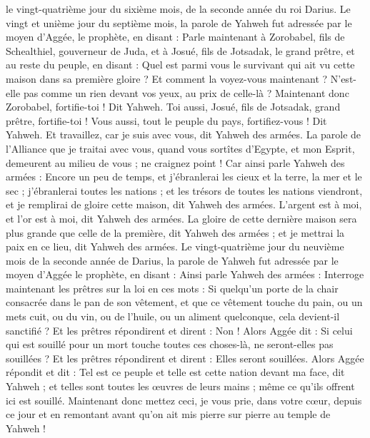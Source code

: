 \begin{multicols}{2}
le vingt-quatrième jour du sixième mois, de la seconde année du roi Darius.
\VerseOne{}Le vingt et unième jour du septième mois, la parole de Yahweh fut adressée par le moyen d'Aggée, le prophète, en disant :
Parle maintenant à Zorobabel, fils de Schealthiel, gouverneur de Juda, et à Josué, fils de Jotsadak, le grand prêtre, et au reste du peuple, en disant :
Quel est parmi vous le survivant qui ait vu cette maison dans sa première gloire ? Et comment la voyez-vous maintenant ? N'est-elle pas comme un rien devant vos yeux, au prix de celle-là ?
Maintenant donc Zorobabel, fortifie-toi ! Dit Yahweh. Toi aussi, Josué, fils de Jotsadak, grand prêtre, fortifie-toi ! Vous aussi, tout le peuple du pays, fortifiez-vous ! Dit Yahweh. Et travaillez, car je suis avec vous, dit Yahweh des armées.
La parole de l'Alliance que je traitai avec vous, quand vous sortîtes d'Egypte, et mon Esprit, demeurent au milieu de vous ; ne craignez point !
Car ainsi parle Yahweh des armées : Encore un peu de temps, et j'ébranlerai les cieux et la terre, la mer et le sec ;
j'ébranlerai toutes les nations ; et les trésors de toutes les nations viendront, et je remplirai de gloire cette maison, dit Yahweh des armées.
L'argent est à moi, et l'or est à moi, dit Yahweh des armées.
La gloire de cette dernière maison sera plus grande que celle de la première, dit Yahweh des armées ; et je mettrai la paix en ce lieu, dit Yahweh des armées.
Le vingt-quatrième jour du neuvième mois de la seconde année de Darius, la parole de Yahweh fut adressée par le moyen d'Aggée le prophète, en disant :
Ainsi parle Yahweh des armées : Interroge maintenant les prêtres sur la loi en ces mots :
Si quelqu'un porte de la chair consacrée dans le pan de son vêtement, et que ce vêtement touche du pain, ou un mets cuit, ou du vin, ou de l'huile, ou un aliment quelconque, cela devient-il sanctifié ? Et les prêtres répondirent et dirent : Non !
Alors Aggée dit : Si celui qui est souillé pour un mort touche toutes ces choses-là, ne seront-elles pas souillées ? Et les prêtres répondirent et dirent : Elles seront souillées.
Alors Aggée répondit et dit : Tel est ce peuple et telle est cette nation devant ma face, dit Yahweh ; et telles sont toutes les œuvres de leurs mains ; même ce qu'ils offrent ici est souillé.
Maintenant donc mettez ceci, je vous prie, dans votre cœur, depuis ce jour et en remontant avant qu'on ait mis pierre sur pierre au temple de Yahweh !

\end{multicols}
